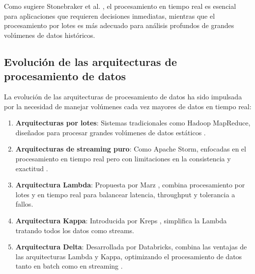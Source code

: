 Como sugiere Stonebraker et al. \parencite{stonebraker2005one}, el procesamiento en tiempo real es esencial para aplicaciones
que requieren decisiones inmediatas, mientras que el procesamiento por lotes es más 
adecuado para análisis profundos de grandes volúmenes de datos históricos.
\newpage
\subsection{Evolución de las arquitecturas de procesamiento de datos}

La evolución de las arquitecturas de procesamiento de datos ha sido impulsada por la necesidad de manejar volúmenes cada vez mayores de datos en tiempo real:

\begin{enumerate}
    \item \textbf{Arquitecturas por lotes}: Sistemas tradicionales como Hadoop MapReduce, diseñados para procesar grandes volúmenes de datos estáticos \parencite{dean2008mapreduce}.
    \item \textbf{Arquitecturas de streaming puro}: Como Apache Storm, enfocadas en el procesamiento en tiempo real pero con limitaciones en la consistencia y exactitud \parencite{toshniwal2014storm}.
    \item \textbf{Arquitectura Lambda}: Propuesta por Marz \parencite{marz2011cap}, combina procesamiento por lotes y en tiempo real para balancear latencia, throughput y tolerancia a fallos.
    \item \textbf{Arquitectura Kappa}: Introducida por Kreps \parencite{kreps2014questioning}, simplifica la Lambda tratando todos los datos como streams.
    \item \textbf{Arquitectura Delta}: Desarrollada por Databricks, combina las ventajas de las arquitecturas Lambda y Kappa, optimizando el procesamiento de datos tanto en batch como en streaming \parencite{deltalake} \parencite{delta}.
\end{enumerate}
\newpage